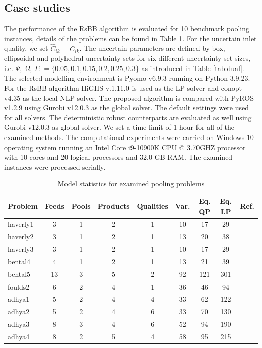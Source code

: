 \documentclass[sn-mathphys-num]{sn-jnl}
\begin{document}
\subsection{Case studies}
The performance of the RsBB algorithm is evaluated for 10 benchmark pooling instances, details of the problems can be found in Table \ref{tab:problem_stats}. For the uncertain inlet quality, we set $\hat{C}_{ik}=C_{ik}$. The uncertain parameters are defined by box, ellipsoidal and polyhedral uncertainty sets for six different uncertainty set sizes, i.e. $\Psi, ~\Omega,~ \Gamma : =\{0.05,0.1,0.15,0.2,0.25,0.3\}$ as introduced in Table \ref{tab:dual}. The selected modelling environment is Pyomo v6.9.3 \citep{Pyomo} running on Python 3.9.23. For the RsBB algorithm HiGHS v.1.11.0 \citep{highs} is used as the LP solver and conopt v4.35 \citep{Drud1994} as the local NLP solver. The proposed algorithm is compared with PyROS v1.2.9 using Gurobi v12.0.3 \citep{gurobi} as the global solver. The default settings were used for all solvers. The deterministic robust counterparts are evaluated as well using Gurobi v12.0.3  as global solver. We set a time limit of 1 hour for all of the examined methods. The computational experiments were carried on Windows 10 operating system running an Intel Core i9-10900K CPU @ 3.70GHZ processor with 10 cores and 20 logical processors and 32.0 GB RAM. The examined instances were processed serially. 

\begin{table}[htpb]
    \centering
    \caption{Model statistics for examined pooling problems}
    \begin{tabular}{lcccccccc}
        \toprule
        Problem & Feeds & Pools & Products & Qualities & Var. & Eq. QP & Eq. LP & Ref. \\
        \midrule
        haverly1 & 3  & 1  & 2  & 1  & 10  & 17  & 29 &\citet{Haverly1978} \\
        haverly2 & 3  & 1  & 2  & 1  & 13  & 20  & 38 &\citet{Haverly1978} \\
        haverly3 & 3  & 1  & 2  & 1  & 10  & 17  & 29 &\citet{Haverly1978} \\
        bental4  & 4  & 1  & 2  & 1  & 13  & 21  & 39 &\citet{Bental94} \\
        bental5  & 13 & 3  & 5  & 2  & 92  & 121 & 301 &\citet{Bental94} \\
        foulds2  & 6  & 2  & 4  & 1  & 36  & 46  & 94 &\citet{Foulds1992} \\
        adhya1   & 5  & 2  & 4  & 4  & 33  & 62  & 122 &\citet{Adhya1999} \\
        adhya2   & 5  & 2  & 4  & 6  & 33  & 70  & 130 &\citet{Adhya1999} \\
        adhya3   & 8  & 3  & 4  & 6  & 52  & 94  & 190 &\citet{Adhya1999} \\
        adhya4   & 8  & 2  & 5  & 4  & 58  & 95  & 215 &\citet{Adhya1999} \\
        \bottomrule
    \end{tabular}
    \label{tab:problem_stats}
\end{table}
\end{document}

